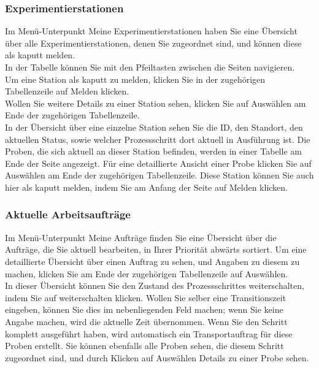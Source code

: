 \documentclass[enabledeprecatedfontcommands,fontsize=12pt,paper=a4,twoside]{scrartcl}
\begin{document}
\subsubsection{Experimentierstationen}
Im Menü-Unterpunkt Meine Experimentierstationen haben Sie eine Übersicht über alle Experimentierstationen, denen Sie zugeordnet sind, und können diese als kaputt melden. \\

In der Tabelle können Sie mit den Pfeiltasten zwischen die Seiten navigieren. \\

Um eine Station als kaputt zu melden, klicken Sie in der zugehörigen Tabellenzeile auf Melden klicken. \\

Wollen Sie weitere Details zu einer Station sehen, klicken Sie auf Auswählen am Ende der zugehörigen Tabellenzeile. \\

In der Übersicht über eine einzelne Station sehen Sie die ID, den Standort, den aktuellen Status, sowie welcher Prozessschritt dort aktuell in Ausführung ist. Die Proben, die sich aktuell an dieser Station befinden, werden in einer Tabelle am Ende der Seite angezeigt. Für eine detaillierte Ansicht einer Probe klicken Sie auf Auswählen am Ende der zugehörigen Tabellenzeile. Diese Station können Sie auch hier als kaputt melden, indem Sie am Anfang der Seite auf Melden klicken. \\

\subsubsection{Aktuelle Arbeitsaufträge}
Im Menü-Unterpunkt Meine Aufträge finden Sie eine Übersicht über die Aufträge, die Sie aktuell bearbeiten, in Ihrer Priorität abwärts sortiert. Um eine detaillierte Übersicht über einen Auftrag zu sehen, und Angaben zu diesem zu machen, klicken Sie am Ende der zugehörigen Tabellenzeile auf Auswählen. \\

In dieser Übersicht können Sie den Zustand des Prozessschrittes weiterschalten, indem Sie auf weiterschalten klicken. Wollen Sie selber eine Transitionszeit eingeben, können Sie dies im nebenliegenden Feld machen; wenn Sie keine Angabe machen, wird die aktuelle Zeit übernommen. Wenn Sie den Schritt komplett ausgeführt haben, wird automatisch ein Transportauftrag für diese Proben erstellt. Sie können ebenfalls alle Proben sehen, die diesem Schritt zugeordnet sind, und durch Klicken auf Auswählen Details zu einer Probe sehen. \\
\end{document}
